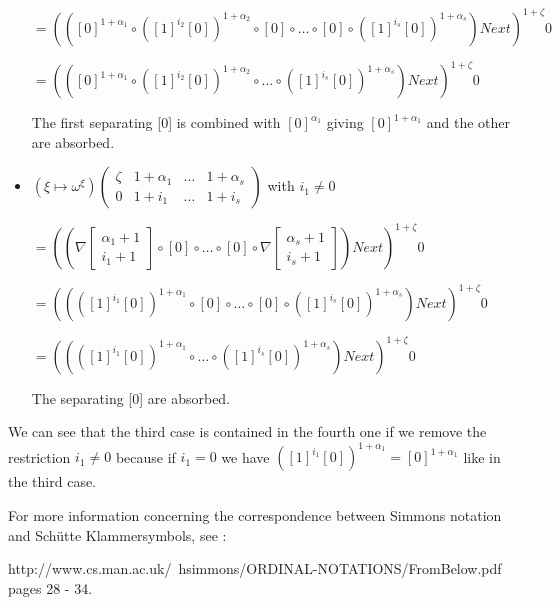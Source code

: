 \documentclass[10pt]{article}
\begin{document}
\begin{itemize}
\( = (([0]^{1+\alpha_1} \circ ([1]^{i_2} [0])^{1+\alpha_2} \circ [0] \circ \ldots \circ [0] \circ ([1]^{i_s} [0])^{1+\alpha_s}) Next)^{1+\zeta} 0 \)

\( = (([0]^{1+\alpha_1} \circ ([1]^{i_2} [0])^{1+\alpha_2} \circ \ldots \circ ([1]^{i_s} [0])^{1+\alpha_s}) Next)^{1+\zeta} 0 \)

The first separating [0] is combined with \( [0]^{\alpha_1} \) giving \( [0]^{1+\alpha_1} \) and the other are absorbed.

\item
\( (\xi \mapsto \omega^\xi) \begin{pmatrix} \zeta & 1+\alpha_1 & \ldots & 1+\alpha_s \\
                                            0     & 1+i_1      & \ldots & 1+i_s      \end{pmatrix} \) with \( i_1 \neq 0 \)

\( = ((\nabla \begin{bmatrix} \alpha_1+1 \\
                              i_1+1      \end{bmatrix} \circ [0] \circ \ldots \circ [0] \circ \nabla \begin{bmatrix} \alpha_s+1 \\
                                                                                                                     i_s+1      \end{bmatrix}) Next)^{1+\zeta} 0 \)

\( = ((([1]^{i_1} [0])^{1+\alpha_1} \circ [0] \circ \ldots \circ [0] \circ ([1]^{i_s} [0])^{1+\alpha_s}) Next)^{1+\zeta} 0 \) 

\( = ((([1]^{i_1} [0])^{1+\alpha_1} \circ \ldots \circ ([1]^{i_s} [0])^{1+\alpha_s}) Next)^{1+\zeta} 0 \) 

The separating [0] are absorbed.

\end{itemize}

We can see that the third case is contained in the fourth one if we remove the restriction \( i_1 \neq 0 \) because if \( i_1 = 0 \) we have \( ([1]^{i_1} [0])^{1+\alpha_1} = [0]^{1+\alpha_1} \) like in the third case.

\bigskip

For more information concerning the correspondence between Simmons notation and Schütte Klammersymbols, see :

http://www.cs.man.ac.uk/~hsimmons/ORDINAL-NOTATIONS/FromBelow.pdf pages 28 - 34.
\end{document}

